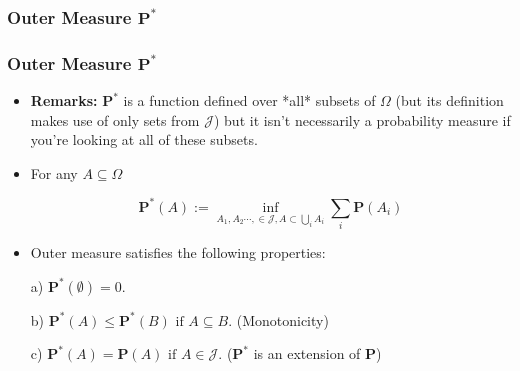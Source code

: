 \documentclass[%
]{beamer}
\newcommand{\BP}{\mathbf{P}}
\begin{document}
\subsubsection{Outer Measure $\BP^*$}
\frame
{
  \frametitle{Outer Measure $\BP^*$}

   \begin{itemize}

      
       \item<1-> \textbf{Remarks:} $\BP^*$ is a function defined over *all* subsets of $\Omega$ (but its definition makes use of only sets from $\mathcal{J}$) but it isn't necessarily a probability measure if you're looking at all of these subsets. 
       
       
		\item<2-> For any $A\subseteq \Omega$
       
       $$\BP^*(A):=\inf_{A_1,A_2\cdots, \in \mathcal{J}, A\subset \bigcup_i A_i} \sum_i \BP(A_i) $$
       
        \item<3->   [] \begin{Lemma} Outer measure satisfies the following properties:  
       
       a) $\BP^*(\emptyset)=0.$
       
       b) $\BP^*(A)\leq \BP^*(B)\text{ if } A\subseteq B.$ (Monotonicity)

       c) $\BP^*(A)= \BP(A)\text{ if } A\in \mathcal{J}.$ ($\BP^*$ is an extension of $\BP$)
        \end{Lemma}    
    
                 \end{itemize}
}
\end{document}
